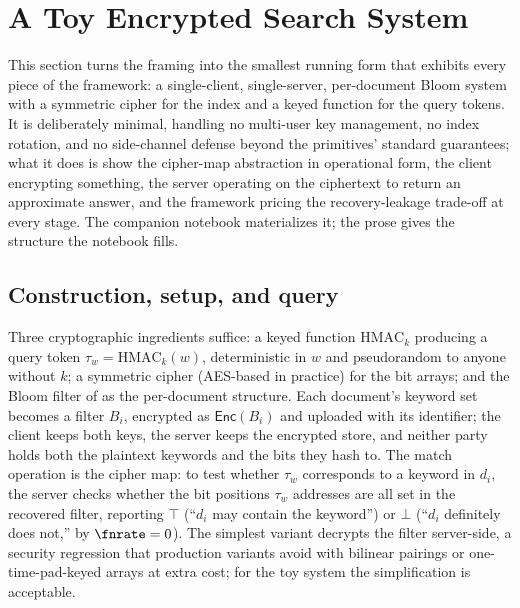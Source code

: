 %

\section{A Toy Encrypted Search System}
\label{sec:toy-system}

This section turns the framing into the smallest running form that
exhibits every piece of the framework: a single-client, single-server,
per-document Bloom system with a symmetric cipher for the index and a
keyed function for the query tokens. It is deliberately minimal, handling
no multi-user key management, no index rotation, and no side-channel
defense beyond the primitives' standard guarantees; what it does is show
the cipher-map abstraction in operational form, the client encrypting
something, the server operating on the ciphertext to return an approximate
answer, and the framework pricing the recovery-leakage trade-off at every
stage. The companion notebook materializes it; the prose gives the
structure the notebook fills.

\subsection*{Construction, setup, and query}

Three cryptographic ingredients suffice: a keyed function
$\mathrm{HMAC}_k$ producing a query token $\tau_w = \mathrm{HMAC}_k(w)$,
deterministic in $w$ and pseudorandom to anyone without $k$; a symmetric
cipher (AES-based in practice) for the bit arrays; and the Bloom
filter of  as the per-document structure. Each
document's keyword set becomes a filter $B_i$, encrypted as
$\mathsf{Enc}(B_i)$ and uploaded with its identifier; the client keeps both
keys, the server keeps the encrypted store, and neither party holds both
the plaintext keywords and the bits they hash to. The match operation is
the cipher map: to test whether $\tau_w$ corresponds to a keyword in
$d_i$, the server checks whether the bit positions $\tau_w$ addresses are
all set in the recovered filter, reporting $\top$ (``$d_i$ may contain the
keyword'') or $\bot$ (``$d_i$ definitely does not,'' by $\fnrate = 0$).
The simplest variant decrypts the filter server-side, a security
regression that production variants avoid with bilinear pairings or
one-time-pad-keyed arrays at extra cost; for the toy system the
simplification is acceptable.

